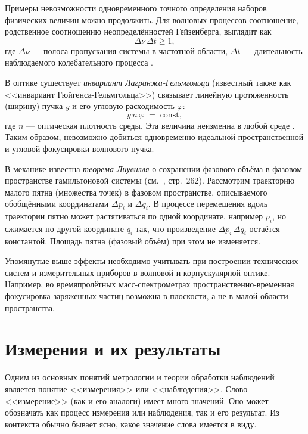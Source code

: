 \documentclass[a5paper,openany]{book}
\newcommand{\const}{\mathrm{const}}
\begin{document}
Примеры невозможности одновременного точного определения наборов физических величин 
можно продолжить. Для волновых процессов соотношение, родственное соотношению 
неопределённостей Гейзенберга,  выглядит как 
\begin{equation*} 
\Delta\nu \,\Delta t \geq 1, 
\end{equation*} 
где $\Delta \nu$ 
--- полоса пропускания системы в частотной области,  $\Delta t$ --- длительность 
наблюдаемого колебательного процесса \cite{ZeldovichMyshkis}. 
  
В оптике существует \emph{инвариант Лагранжа-Гельмгольца} (известный также как 
<<инвариант Гюйгенса-Гельмгольца>>) связывает линейную протяженность (ширину) 
пучка $y$ и его угловую расходимость $\varphi$:  
\begin{equation*} 
y\,n\,\varphi \; = \;\const, 
\end{equation*} 
где $n$ --- оптическая плотность среды. Эта величина неизменна в любой среде 
\cite{Tudorovski1948}. Таким образом, невозможно добиться одновременно идеальной 
пространственной и угловой фокусировки волнового пучка. 
  
В механике известна \emph{теорема Лиувилля} о сохранении фазового объёма 
в фазовом пространстве гамильтоновой системы (см.~\cite{Gantmacher}, стр.~262). 
Рассмотрим траекторию малого пятна (множества точек) в фазовом пространстве, 
описываемого обобщёнными координатами $\Delta p_{i}$ и $\Delta q_{i}$. В процессе 
перемещения вдоль траектории пятно может растягиваться по одной координате, 
например $p_{i}$, но сжимается по другой координате $q_{i}$ так, что произведение 
$\Delta p_{i}\,\Delta q_{i}$ остаётся константой. Площадь пятна (фазовый объём) 
при этом не изменяется. 
   
Упомянутые выше эффекты необходимо учитывать при построении технических систем 
и измерительных приборов в волновой и корпускулярной оптике. Например, 
во времяпролётных масс-спектрометрах пространственно-временная фокусировка 
заряженных частиц возможна в плоскости, а не в малой области пространства. 
  
  
\section{Измерения и их результаты} 
\label{MeasuResultSect} 
      
Одним из основных понятий метрологии и теории обработки наблюдений является понятие 
<<измерения>> или <<наблюдения>>. Слово <<измерение>> (как и его аналоги) имеет 
много значений. Оно может обозначать как процесс измерения или наблюдения, так и 
его результат. Из контекста обычно бывает ясно, какое значение слова имеется в виду. 
  
\end{document}
